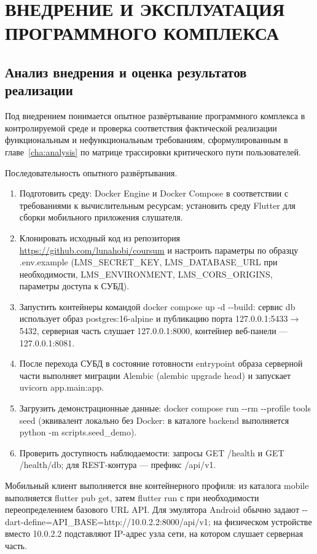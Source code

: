 \chapter{{\fontsize{14pt}{21pt}\selectfont\MakeUppercase{Внедрение и эксплуатация программного комплекса}}}
\label{cha:impl}

\section{Анализ внедрения и оценка результатов реализации}

Под внедрением понимается опытное развёртывание программного комплекса в контролируемой среде и проверка соответствия фактической реализации функциональным и нефункциональным требованиям, сформулированным в главе~\ref{cha:analysis} по матрице трассировки критического пути пользователей\cite{metodichka_vkr_ikt_2021,gost1920178,gost3460190}.

Последовательность опытного развёртывания.
\begin{enumerate}
  \item Подготовить среду: Docker Engine и Docker Compose в соответствии с требованиями к вычислительным ресурсам; установить среду Flutter для сборки мобильного приложения слушателя.
  \item Клонировать исходный код из репозитория \url{https://github.com/lunahobi/coursum} и настроить параметры по образцу .env.example (LMS\_SECRET\_KEY, LMS\_DATABASE\_URL при необходимости, LMS\_ENVIRONMENT, LMS\_CORS\_ORIGINS, параметры доступа к СУБД).
  \item Запустить контейнеры командой docker compose up -d {-}{-}build: сервис db использует образ postgres:16-alpine и публикацию порта 127.0.0.1:5433\(\rightarrow\)5432, серверная часть слушает 127.0.0.1:8000, контейнер веб-панели --- 127.0.0.1:8081.
  \item После перехода СУБД в состояние готовности entrypoint образа серверной части выполняет миграции Alembic (alembic upgrade head) и запускает uvicorn app.main:app.
  \item Загрузить демонстрационные данные: docker compose run {-}{-}rm {-}{-}profile tools seed (эквивалент локально без Docker: в каталоге backend выполняется python -m scripts.seed\_demo).
  \item Проверить доступность наблюдаемости: запросы GET /health и GET /health/db; для REST-контура --- префикс /api/v1.
\end{enumerate}

Мобильный клиент выполняется вне контейнерного профиля: из каталога mobile выполняется flutter pub get, затем flutter run с при необходимости переопределением базового URL API. Для эмулятора Android обычно задают {-}{-}dart-define=API\_BASE=http://10.0.2.2:8000/api/v1; на физическом устройстве вместо 10.0.2.2 подставляют IP-адрес узла сети, на котором слушает серверная часть\cite{flutter_docs,docker_compose_docs,fastapi_docs}.

